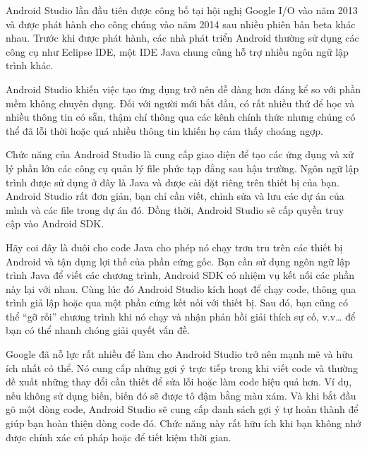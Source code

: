  Android Studio lần đầu tiên được công bố tại hội nghị Google I/O vào năm 2013 và được phát hành cho công chúng vào năm 2014 sau nhiều phiên bản beta khác nhau. Trước khi được phát hành, các nhà phát triển Android thường sử dụng các công cụ như Eclipse IDE, một IDE Java chung cũng hỗ trợ nhiều ngôn ngữ lập trình khác.
 
 Android Studio khiến việc tạo ứng dụng trở nên dễ dàng hơn đáng kể so với phần mềm không chuyên dụng. Đối với người mới bắt đầu, có rất nhiều thứ để học và nhiều thông tin có sẵn, thậm chí thông qua các kênh chính thức nhưng chúng có thể đã lỗi thời hoặc quá nhiều thông tin khiến họ cảm thấy choáng ngợp.
 
 Chức năng của Android Studio là cung cấp giao diện để tạo các ứng dụng và xử lý phần lớn các công cụ quản lý file phức tạp đằng sau hậu trường. Ngôn ngữ lập trình được sử dụng ở đây là Java và được cài đặt riêng trên thiết bị của bạn. Android Studio rất đơn giản, bạn chỉ cần viết, chỉnh sửa và lưu các dự án của mình và các file trong dự án đó. Đồng thời, Android Studio sẽ cấp quyền truy cập vào Android SDK.
 
 Hãy coi đây là đuôi cho code Java cho phép nó chạy trơn tru trên các thiết bị Android và tận dụng lợi thế của phần cứng gốc. Bạn cần sử dụng ngôn ngữ lập trình Java để viết các chương trình, Android SDK có nhiệm vụ kết nối các phần này lại với nhau. Cùng lúc đó Android Studio kích hoạt để chạy code, thông qua trình giả lập hoặc qua một phần cứng kết nối với thiết bị. Sau đó, bạn cũng có thể “gỡ rối” chương trình khi nó chạy và nhận phản hồi giải thích sự cố, v.v… để bạn có thể nhanh chóng giải quyết vấn đề.
 
 Google đã nỗ lực rất nhiều để làm cho Android Studio trở nên mạnh mẽ và hữu ích nhất có thể. Nó cung cấp những gợi ý trực tiếp trong khi viết code và thường đề xuất những thay đổi cần thiết để sửa lỗi hoặc làm code hiệu quả hơn. Ví dụ, nếu không sử dụng biến, biến đó sẽ được tô đậm bằng màu xám. Và khi bắt đầu gõ một dòng code, Android Studio sẽ cung cấp danh sách gợi ý tự hoàn thành để giúp bạn hoàn thiện dòng code đó. Chức năng này rất hữu ích khi bạn không nhớ được chính xác cú pháp hoặc để tiết kiệm thời gian\cite{tl3}.
 
